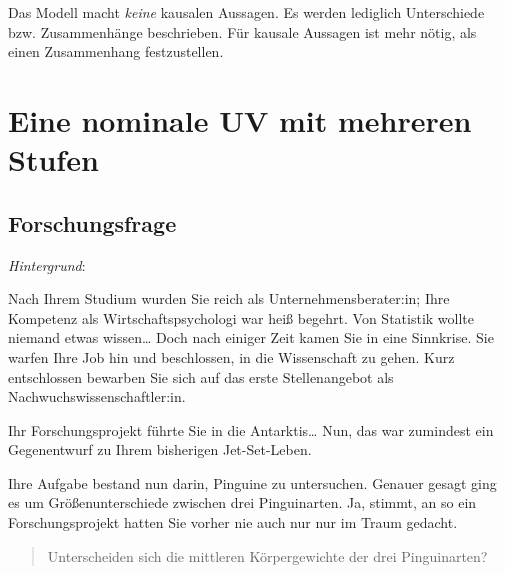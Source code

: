 \documentclass[
  a4paper,
  DIV=11]{scrreprt}
\theoremstyle{definition}
\theoremstyle{remark}
\begin{document}
\begin{tcolorbox}[enhanced jigsaw, title=\textcolor{quarto-callout-important-color}{\faExclamation}\hspace{0.5em}{Wichtig}, bottomtitle=1mm, bottomrule=.15mm, titlerule=0mm, colbacktitle=quarto-callout-important-color!10!white, colframe=quarto-callout-important-color-frame, leftrule=.75mm, left=2mm, toprule=.15mm, colback=white, arc=.35mm, breakable, toptitle=1mm, opacityback=0, rightrule=.15mm, coltitle=black, opacitybacktitle=0.6]

Das Modell macht \emph{keine} kausalen Aussagen. Es werden lediglich
Unterschiede bzw. Zusammenhänge beschrieben. Für kausale Aussagen ist
mehr nötig, als einen Zusammenhang festzustellen.

\end{tcolorbox}

\hypertarget{eine-nominale-uv-mit-mehreren-stufen}{%
\section{Eine nominale UV mit mehreren
Stufen}\label{eine-nominale-uv-mit-mehreren-stufen}}

\hypertarget{forschungsfrage-2}{%
\subsection{Forschungsfrage}\label{forschungsfrage-2}}

\emph{Hintergrund}:

Nach Ihrem Studium wurden Sie reich als Unternehmensberater:in; Ihre
Kompetenz als Wirtschaftspsychologi war heiß begehrt. Von Statistik
wollte niemand etwas wissen\ldots{} Doch nach einiger Zeit kamen Sie in
eine Sinnkrise. Sie warfen Ihre Job hin und beschlossen, in die
Wissenschaft zu gehen. Kurz entschlossen bewarben Sie sich auf das erste
Stellenangebot als Nachwuchswissenschaftler:in.

Ihr Forschungsprojekt führte Sie in die Antarktis\ldots{} Nun, das war
zumindest ein Gegenentwurf zu Ihrem bisherigen Jet-Set-Leben.

Ihre Aufgabe bestand nun darin, Pinguine zu untersuchen. Genauer gesagt
ging es um Größenunterschiede zwischen drei Pinguinarten. Ja, stimmt, an
so ein Forschungsprojekt hatten Sie vorher nie auch nur nur im Traum
gedacht.

\begin{quote}
Unterscheiden sich die mittleren Körpergewichte der drei Pinguinarten?
\end{quote}
\end{document}
